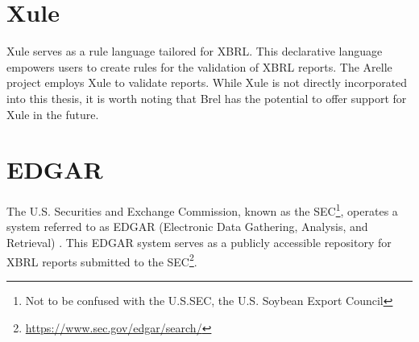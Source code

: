 \section{Xule}
Xule\cite{xule} serves as a rule language tailored for XBRL. 
This declarative language empowers users to create rules for the validation of XBRL reports. 
The Arelle project employs Xule to validate reports. 
While Xule is not directly incorporated into this thesis, it is worth noting that Brel has the potential to offer support for Xule in the future.


\section{EDGAR}
\label{sec:edgar}
The U.S. Securities and Exchange Commission, known as the SEC\footnote{Not to be confused with the U.S.SEC, the U.S. Soybean Export Council},
operates a system referred to as EDGAR (Electronic Data Gathering, Analysis, and Retrieval) \cite{sec_edgar}. 
This EDGAR system serves as a publicly accessible repository for XBRL reports submitted to the SEC\footnote{\url{https://www.sec.gov/edgar/search/}}.


